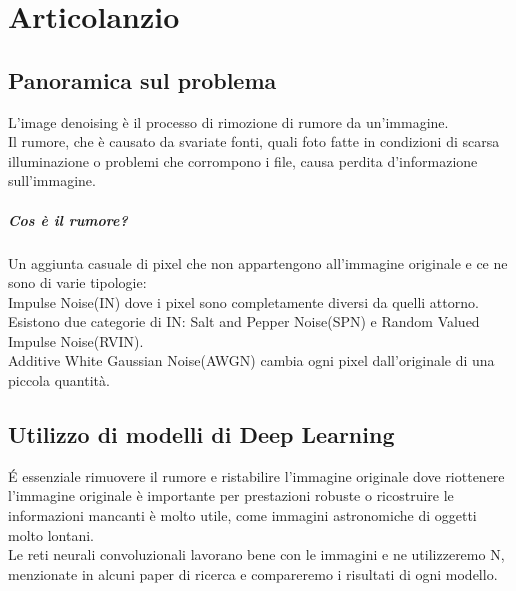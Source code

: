 \documentclass[12pt,a4paper,openright,twoside]{book}
\begin{document}
\titleformat{\chapter}{\normalfont\huge \bfseries}{\Huge \thechapter}{20pt}{\Huge}
\tableofcontents

\chapter{Articolanzio}
\section{Panoramica sul problema}
L'image denoising è il processo di rimozione di rumore da un'immagine.\\
Il rumore, che è causato da svariate fonti, quali foto fatte in condizioni di scarsa illuminazione o problemi che corrompono i file, causa perdita d'informazione sull'immagine.
\paragraph{Cos è il rumore?} 
Un aggiunta casuale di pixel che non appartengono all'immagine originale e ce ne sono di varie tipologie:\\
Impulse Noise(IN) dove i pixel sono completamente diversi da quelli attorno. Esistono due categorie di IN: Salt and Pepper Noise(SPN) e Random Valued Impulse Noise(RVIN).\\
Additive White Gaussian Noise(AWGN) cambia ogni pixel dall'originale di una piccola quantità.\\

\section{Utilizzo di modelli di Deep Learning}
\'E essenziale rimuovere il rumore e ristabilire l'immagine originale dove 
riottenere l'immagine originale è importante per prestazioni robuste o ricostruire le informazioni mancanti è molto utile, come immagini astronomiche di oggetti molto lontani.\\
Le reti neurali convoluzionali lavorano bene con le immagini e ne utilizzeremo N, menzionate in alcuni paper di ricerca e compareremo i risultati di ogni modello.\\
\end{document}
